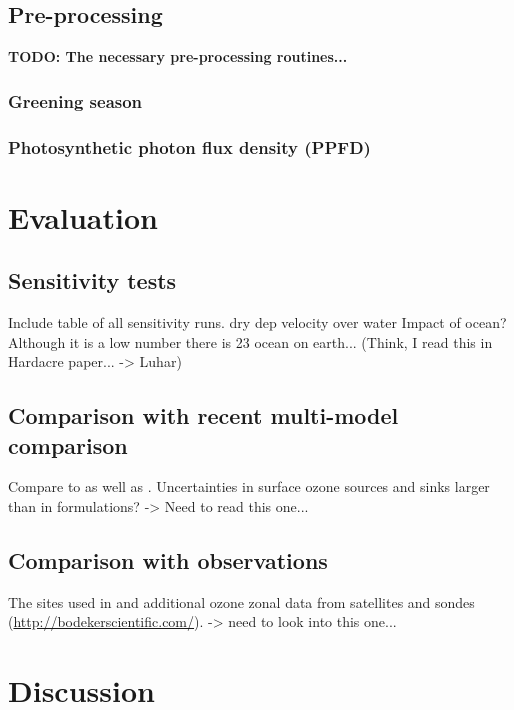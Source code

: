 \documentclass[gmd, manuscript]{copernicus}
\begin{document}
\subsection{Pre-processing}
\label{subsec:pre-pro}
      {\bf TODO: The necessary pre-processing routines...}
      \subsubsection{Greening season}
      \label{subsubsection:greening}
      \subsubsection{Photosynthetic photon flux density (PPFD)}
\section{Evaluation}
\label{sec:eval}
\subsection{Sensitivity tests}
\label{subsec:sens}
Include table of all sensitivity runs.
\citep[e.g., $v^\chem{O_3}_{ice/snow} = 1/10000\,\unit{cm s^{-1}}$,][]{ACP:Helmig2007}
dry dep velocity over water \citep{JGR:Helmig2012} Impact of ocean? Although it is a low number there is 2\/3 ocean on earth... (Think, I read this in Hardacre paper... -> Luhar)
\subsection{Comparison with recent multi-model comparison}
\label{subsec:model}
Compare to \citet{ACP:Hardacre2015} as well as \citet{ACP:Luhar2017}. \citep{AE:Derwent2018} Uncertainties in surface ozone sources and sinks larger than in formulations? -> Need to read this one...
\subsection{Comparison with observations}
\label{subsec:obs}
The sites used in \citet{ACP:Hardacre2015} and additional ozone zonal data from satellites and sondes (\url{http://bodekerscientific.com/}). \citep{AE:Hu2017} -> need to look into this one...
\section{Discussion}
\label{sec:disc}
\end{document}
